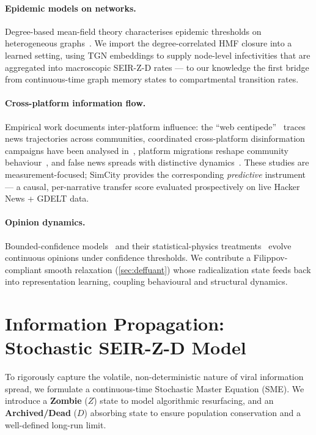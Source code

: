\documentclass[11pt]{article}
\begin{document}
\paragraph{Epidemic models on networks.}
Degree-based mean-field theory characterises epidemic thresholds on
heterogeneous graphs~\citep{pastor2001epidemic,boguna2002correlated,pastor2015epidemic}.
We import the degree-correlated HMF closure into a learned setting, using TGN
embeddings to supply node-level infectivities that are aggregated into
macroscopic SEIR-Z-D rates --- to our knowledge the first bridge from
continuous-time graph memory states to compartmental transition rates.

\paragraph{Cross-platform information flow.}
Empirical work documents inter-platform influence: the ``web
centipede''~\citep{zannettou2017webcentipede} traces news trajectories across
communities, coordinated cross-platform disinformation campaigns have been
analysed in~\citep{wilson2020crossplatform}, platform migrations reshape community
behaviour~\citep{horta2021migrations}, and false news spreads with distinctive
dynamics~\citep{vosoughi2018spread}. These studies are measurement-focused;
SimCity provides the corresponding \emph{predictive} instrument --- a causal,
per-narrative transfer score evaluated prospectively on live Hacker News +
GDELT data.

\paragraph{Opinion dynamics.}
Bounded-confidence models~\citep{deffuant2000mixing,hegselmann2002opinion} and
their statistical-physics treatments~\citep{castellano2009statistical} evolve
continuous opinions under confidence thresholds. We contribute a
Filippov-compliant smooth relaxation (\cref{sec:deffuant}) whose radicalization
state feeds back into representation learning, coupling behavioural and
structural dynamics.

\section{Information Propagation: Stochastic SEIR-Z-D Model}
\label{sec:seir}

To rigorously capture the volatile, non-deterministic nature of viral information
spread, we formulate a continuous-time Stochastic Master Equation (SME). We
introduce a \textbf{Zombie} ($Z$) state to model algorithmic resurfacing, and an
\textbf{Archived/Dead} ($D$) absorbing state to ensure population conservation
and a well-defined long-run limit.
\end{document}
